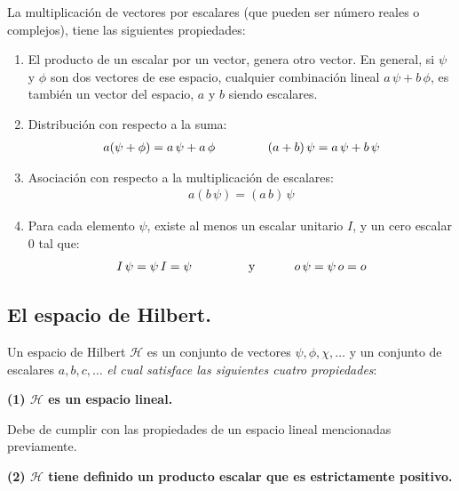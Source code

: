 La multiplicación de vectores por escalares (que pueden ser número reales o complejos), tiene las siguientes propiedades:
\begin{enumerate}
\item El producto de un escalar por un vector, genera otro vector. En general, si $\psi$ y $\phi$ son dos vectores de ese espacio, cualquier combinación lineal $a \, \psi + b \, \phi$, es también un vector del espacio, $a$ y $b$ siendo escalares.
\item Distribución con respecto a la suma:
\begin{align}
a (\psi + \phi) = a \, \psi + a \, \phi \hspace{1.5cm} (a + b) \, \psi = a \, \psi + b \, \psi
\label{eq:ecuacion_02_01}
\end{align}
\item Asociación con respecto a la multiplicación de escalares:
\begin{align}
a (b \, \psi) = (a \, b) \, \psi
\label{eq:ecuacion_02_02}
\end{align}
\item Para cada elemento $\psi$, existe al menos un escalar unitario $I$, y un cero escalar $0$ tal que:
\begin{align}
I \, \psi = \psi \, I = \psi \hspace{1.5cm} \mbox{ y } \hspace{1cm} o \, \psi = \psi \, o = o
\label{eq:ecuacion_02_03}
\end{align}
\end{enumerate}

\subsection{El espacio de Hilbert.}

Un espacio de Hilbert $\mathcal{H}$ es un conjunto de vectores $\psi, \phi, \chi, \ldots$ y un conjunto de escalares $a, b, c, \ldots$ \emph{el cual satisface las siguientes cuatro propiedades}:

\textbf{(1) $\mathcal{H}$ es un espacio lineal.}

Debe de cumplir con las propiedades de un espacio lineal mencionadas previamente.

\textbf{(2) $\mathcal{H}$ tiene definido un producto escalar que es estrictamente positivo.}


